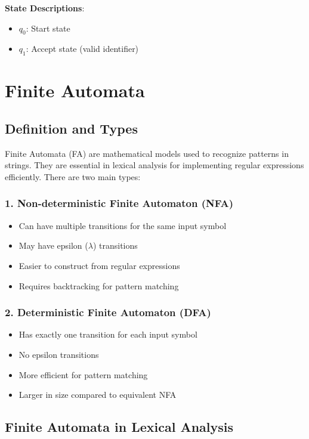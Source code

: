 \documentclass[12pt,a4paper]{article}
\begin{document}
\textbf{State Descriptions}:
\begin{itemize}
    \item \textbf{$q_0$}: Start state
    \item \textbf{$q_1$}: Accept state (valid identifier)
\end{itemize}

\section{Finite Automata}

\subsection{Definition and Types}

Finite Automata (FA) are mathematical models used to recognize patterns in strings. They are essential in lexical analysis for implementing regular expressions efficiently. There are two main types:

\subsubsection{1. Non-deterministic Finite Automaton (NFA)}
\begin{itemize}[itemsep=2pt]
    \item Can have multiple transitions for the same input symbol
    \item May have epsilon ($\lambda$) transitions
    \item Easier to construct from regular expressions
    \item Requires backtracking for pattern matching
\end{itemize}

\subsubsection{2. Deterministic Finite Automaton (DFA)}
\begin{itemize}[itemsep=2pt]
    \item Has exactly one transition for each input symbol
    \item No epsilon transitions
    \item More efficient for pattern matching
    \item Larger in size compared to equivalent NFA
\end{itemize}

\subsection{Finite Automata in Lexical Analysis}
\end{document}

